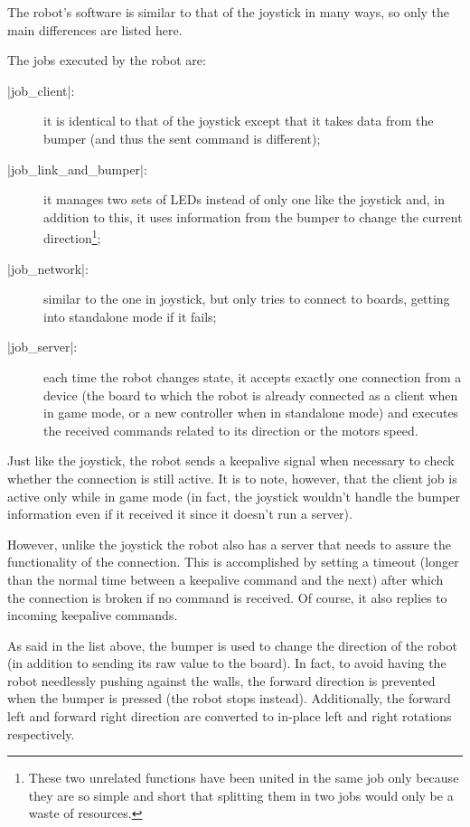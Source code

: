 The robot's software is similar to that of the joystick in many ways, so only
the main differences are listed here.

\beforelist The jobs executed by the robot are:
\begin{description}
  \item[\Code|job\_client|:] it is identical to that of the joystick except that
    it takes data from the bumper (and thus the sent command is different);
  \item[\Code|job\_link\_and\_bumper|:] it manages two sets of LEDs instead of
    only one like the joystick and, in addition to this, it uses information
    from the bumper to change the current direction\footnote{These two unrelated
    functions have been united in the same job only because they are so simple
    and short that splitting them in two jobs would only be a waste of
    resources.};
  \item[\Code|job\_network|:] similar to the one in joystick, but only tries to
    connect to boards, getting into standalone mode if it fails;
  \item[\Code|job\_server|:] each time the robot changes state, it accepts
    exactly one connection from a device (the board to which the robot is
    already connected as a client when in game mode, or a new controller when in
    standalone mode) and executes the received commands related to its direction
    or the motors speed.
\end{description}
\afterlist*
Just like the joystick, the robot sends a keepalive signal when necessary to
check whether the connection is still active.
It is to note, however, that the client job is active only while in game mode
(in fact, the joystick wouldn't handle the bumper information even if it
received it since it doesn't run a server).

However, unlike the joystick the robot also has a server that needs to assure
the functionality of the connection.
This is accomplished by setting a timeout (longer than the normal time between
a keepalive command and the next) after which the connection is broken if no
command is received.
Of course, it also replies to incoming keepalive commands.

As said in the list above, the bumper is used to change the direction of the robot
(in addition to sending its raw value to the board).
In fact, to avoid having the robot needlessly pushing against the walls, the
forward direction is prevented when the bumper is pressed (the robot stops
instead).
Additionally, the forward left and forward right direction are converted
to in-place left and right rotations respectively.
